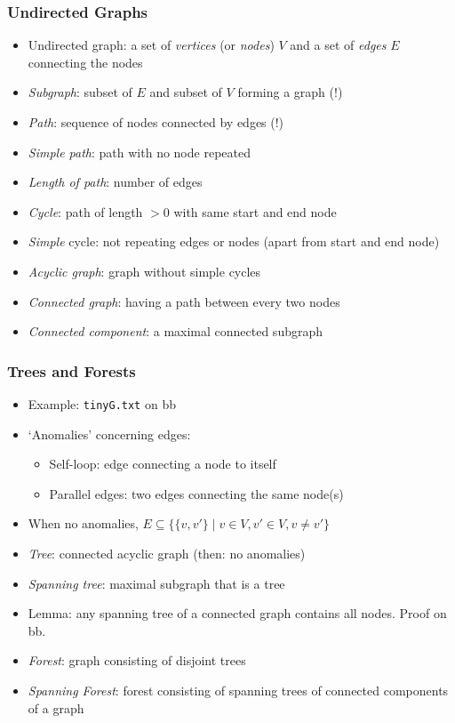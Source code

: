 \documentclass[handout]{beamer}
\newcommand{\set}[1]{\{#1\}}
\begin{document}
\begin{frame}
    \frametitle{Undirected Graphs}

\begin{itemize}[<+->]
\item Undirected graph: a set of \emph{vertices} (or \emph{nodes}) $V$
and a set of \emph{edges} $E$ connecting the nodes
\item\emph{Subgraph}: subset of $E$ and subset of $V$ forming a graph (!)
\item\emph{Path}: sequence of nodes connected by edges (!)
\item\emph{Simple path}: path with no node repeated
\item\emph{Length of path}: number of edges
\item\emph{Cycle}: path of length $>0$ with same start and end node
\item\emph{Simple} cycle: not repeating edges or nodes
(apart from start and end node)
\item\emph{Acyclic graph}: graph without simple cycles
\item\emph{Connected graph}: having a path between every two nodes
\item\emph{Connected component}: a maximal connected subgraph
\end{itemize}
\end{frame}

\begin{frame}\label{tree_forest}
    \frametitle{Trees and Forests}

\begin{itemize}[<+->]
\item Example: {\tt tinyG.txt} on bb
\item `Anomalies' concerning edges:
  \begin{itemize}
  \item Self-loop: edge connecting a node to itself
  \item Parallel edges: two edges connecting the same node(s)
  \end{itemize}
\item When no anomalies, $E \subseteq \set{\set{v,v'}\mid v\in V, v'\in V, v\neq v'}$
\item\emph{Tree}: connected acyclic graph (then: no anomalies)
\item\emph{Spanning tree}: maximal subgraph that is a tree
\item Lemma: any spanning tree of a connected graph contains all nodes.
Proof on bb.
\item\emph{Forest}: graph consisting of disjoint trees
\item\emph{Spanning Forest}: forest consisting of spanning trees of connected components of a graph
\end{itemize}
\end{frame}
\end{document}
